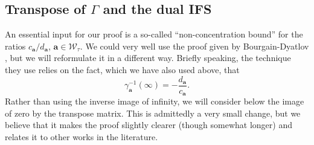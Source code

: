 \documentclass[12pt]{amsart}
\newcommand{\R}{\mathbb{R}}
\newcommand*\abs[1]{
	\left|#1\right|
}
\theoremstyle{definition}
\begin{document}

\subsection{Transpose of $\Gamma$ and the dual IFS}\label{sec:dualIFS}
An essential input for our proof is a so-called ``non-concentration bound'' for the ratios $c_\mathbf{a}/d_\mathbf{a}$, $\mathbf{a} \in \mathcal{W}_\tau$. We could very well use the proof given by Bourgain-Dyatlov \cite[proof of Lemma 2.16]{BD}, but we will reformulate it in a different way. Briefly speaking, the technique they use relies on the fact, which we have also used above, that
\[\gamma_\mathbf{a}^{-1}(\infty) = -\frac{d_\mathbf{a}}{c_\mathbf{a}}.\]
Rather than using the inverse image of infinity, we will consider below the image of zero by the transpose matrix. This is admittedly a very small change, but we believe that it makes the proof slightly clearer (though somewhat longer) and relates it to other works in the literature.
\end{document}
